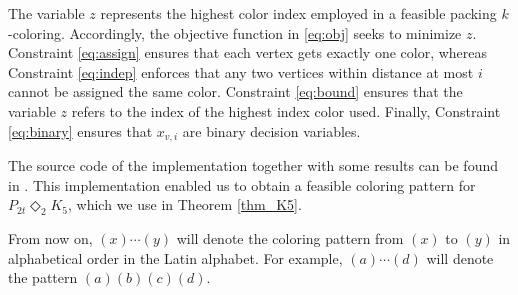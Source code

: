 \documentclass{article}
\begin{document}
The variable $z$ represents the highest color index employed in a feasible packing $k$-coloring. Accordingly, the objective function in \eqref{eq:obj} seeks to minimize $z$. Constraint \eqref{eq:assign} ensures that each vertex gets exactly one color, whereas Constraint \eqref{eq:indep} enforces that any two vertices within distance at most $i$ cannot be assigned the same color. Constraint \eqref{eq:bound} ensures that the variable $z$ refers to the index of the highest index color used. Finally, Constraint \eqref{eq:binary} ensures that $x_{v,i}$ are binary decision variables. 

The source code of the implementation together with some results can be found in \cite{melih2025ilp}. This implementation enabled us to obtain a feasible coloring pattern for $P_{2t} \Diamond_2 K_5$, which we use in Theorem \ref{thm_K5}.

From now on, $(x) \cdots (y)$ will denote the coloring pattern from $(x)$ to $(y)$ in alphabetical order in the Latin alphabet. For example, $(a)\cdots (d)$ will denote the pattern $(a)(b)(c)(d)$.
\end{document}
